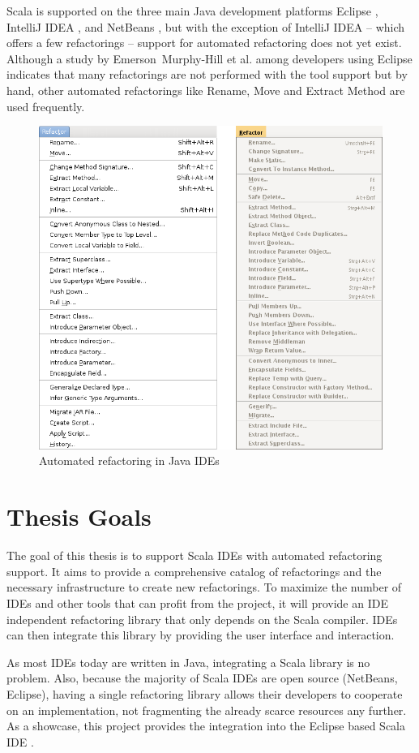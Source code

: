 \documentclass[10pt,a4paper,oneside]{scrreprt}
\begin{document}
Scala is supported on the three main Java development platforms Eclipse \cite{EclipseScalaIDE}, IntelliJ IDEA \cite{IntelliJScalaIDE}, and NetBeans \cite{NetBeansJScalaIDE}, but with the exception of IntelliJ IDEA -- which offers a few refactorings -- support for automated refactoring does not yet exist. Although a study by Emerson~Murphy-Hill et al. among developers using Eclipse \cite{RefactoringStudy} indicates that many refactorings are not performed with the tool support but by hand, other automated refactorings like Rename, Move and Extract Method are used frequently.

\begin{figure}
 \centering
 \includegraphics[width=0.7\linewidth]{ide_refactorings.png}
 \caption{Automated refactoring in Java IDEs}
 \label{figure:ide_refactorings}
\end{figure}

\section{Thesis Goals}

The goal of this thesis is to support Scala IDEs with automated refactoring support. It aims to provide a comprehensive catalog of refactorings and the necessary infrastructure to create new refactorings. To maximize the number of IDEs and other tools that can profit from the project, it will provide an IDE independent refactoring library that only depends on the Scala compiler. IDEs can then integrate this library by providing the user interface and interaction.

As most IDEs today are written in Java, integrating a Scala library is no problem. Also, because the majority of Scala IDEs are open source (NetBeans, Eclipse), having a single refactoring library allows their developers to cooperate on an implementation, not fragmenting the already scarce resources any further. As a showcase, this project provides the integration into the Eclipse based Scala IDE \cite{EclipseScalaIDE}.
\end{document}
